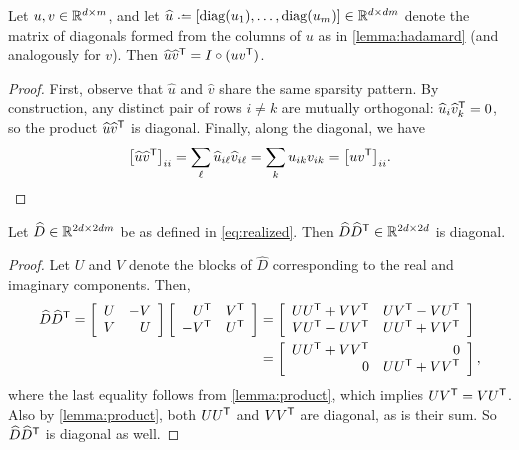 \documentclass{article} %
\begin{document}
\begin{lemma}
Let ${u, v \in \mathbb{R}^{d\times m}}$, and let ${\widehat{u} \defeq
[\diag(u_1),\dots,\diag(u_m)] \in \R^{d\times dm}}$ denote the 
matrix of diagonals formed from the columns of $u$ as in \cref{lemma:hadamard} 
(and analogously for $v$).  Then ${\widehat{u}\widehat{v}^\mathsf{T} = I \circ (uv^\mathsf{T})}$.
\label{lemma:product}
\end{lemma}
\begin{proof}
First, observe that $\widehat{u}$ and $\widehat{v}$ share the same sparsity pattern.  
By construction, any distinct pair of rows $i \neq k$ are mutually orthogonal:
$\widehat{u}_i \widehat{v}_k^\mathsf{T} = 0$, so the product $\widehat{u}\widehat{v}^\mathsf{T}$ 
is diagonal.  Finally, along the diagonal, we have
\[
{\left[\widehat{u}\widehat{v}^\mathsf{T}\right]}_{ii} = \sum_\ell \widehat{u}_{i\ell}
\widehat{v}_{i\ell} = \sum_{k} u_{ik} v_{ik} = {\left[uv^\mathsf{T}\right]}_{ii}.
\]
\end{proof}

\begin{theorem}
Let $\widehat{D} \in \mathbb{R}^{2d\times 2dm}$ be as defined in \eqref{eq:realized}.  Then
$\widehat{D}\widehat{D}^\mathsf{T} \in \mathbb{R}^{2d\times 2d}$ is diagonal.\label{thm:diagonal}
\end{theorem}
\begin{proof}
Let $U$ and $V$ denote the blocks of $\widehat{D}$ corresponding to the
real and imaginary components.  Then,
\begin{align}
\widehat{D}\widehat{D}^\mathsf{T} = \left[\begin{array}{rr}U & -V\\ V & U\end{array}\right]
\left[\begin{array}{rr} U^\mathsf{T} & V^\mathsf{T}\\ -V^\mathsf{T} & U^\mathsf{T}\end{array}\right]
&= \left[\begin{array}{rr} UU^\mathsf{T} + VV^\mathsf{T} & UV^\mathsf{T} - VU^\mathsf{T} \\ VU^\mathsf{T} -
UV^\mathsf{T} & UU^\mathsf{T} + VV^\mathsf{T}\end{array} \right]\notag\\
&= \left[\begin{array}{rr}UU^\mathsf{T} + VV^\mathsf{T} & 0 \\ 0 & UU^\mathsf{T} + VV^\mathsf{T}\end{array}
\right],\label{eq:dictpower}
\end{align}
where the last equality follows from \cref{lemma:product}, which implies 
$UV^\mathsf{T} = VU^\mathsf{T}$.  Also by \cref{lemma:product}, both $UU^\mathsf{T}$ and $VV^\mathsf{T}$ are 
diagonal, as is their sum.  So $\widehat{D}\widehat{D}^\mathsf{T}$ is diagonal as well.
\end{proof}
\end{document}
